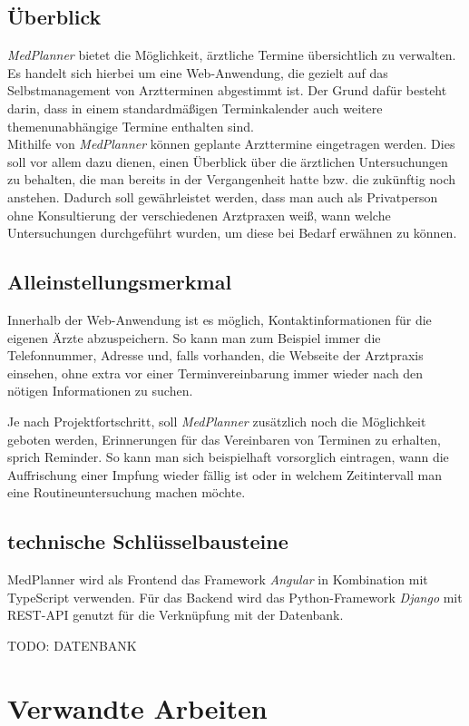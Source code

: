\documentclass[conference]{IEEEtran}
\begin{document}
\subsection{Überblick}
\textit{MedPlanner} bietet die Möglichkeit, ärztliche Termine übersichtlich zu verwalten. Es handelt sich hierbei um eine Web-Anwendung, die gezielt auf das Selbstmanagement von Arztterminen abgestimmt ist. Der Grund dafür besteht darin, dass in einem standardmäßigen Terminkalender auch weitere themenunabhängige Termine enthalten sind.\\
Mithilfe von \textit{MedPlanner} können geplante Arzttermine eingetragen werden. Dies soll vor allem dazu dienen, einen Überblick über die ärztlichen Untersuchungen zu behalten, die man bereits in der Vergangenheit hatte bzw. die zukünftig noch anstehen. Dadurch soll gewährleistet werden, dass man auch als Privatperson ohne Konsultierung der verschiedenen Arztpraxen weiß, wann welche Untersuchungen durchgeführt wurden, um diese bei Bedarf erwähnen zu können.

\subsection{Alleinstellungsmerkmal}
Innerhalb der Web-Anwendung ist es möglich, Kontaktinformationen für die eigenen Ärzte abzuspeichern. So kann man zum Beispiel immer die Telefonnummer, Adresse und, falls vorhanden, die Webseite der Arztpraxis einsehen, ohne extra vor einer Terminvereinbarung immer wieder nach den nötigen Informationen zu suchen.

Je nach Projektfortschritt, soll \textit{MedPlanner} zusätzlich noch die Möglichkeit geboten werden, Erinnerungen für das Vereinbaren von Terminen zu erhalten, sprich Reminder. So kann man sich beispielhaft vorsorglich eintragen, wann die Auffrischung einer Impfung wieder fällig ist oder in welchem Zeitintervall man eine Routineuntersuchung machen möchte.\\

\subsection{technische Schlüsselbausteine}
MedPlanner wird als Frontend das Framework \textit{Angular} in Kombination mit TypeScript verwenden. Für das Backend wird das Python-Framework \textit{Django} mit REST-API genutzt für die Verknüpfung mit der Datenbank.

TODO: DATENBANK

\section{Verwandte Arbeiten}
\end{document}
